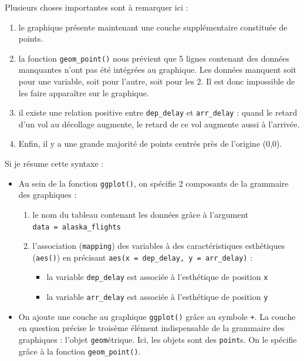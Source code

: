 \documentclass[a4paperpaper,]{article}
\providecommand{\tightlist}{%
  \setlength{\itemsep}{0pt}\setlength{\parskip}{0pt}}
\theoremstyle{definition}
\theoremstyle{definition}
\theoremstyle{definition}
\theoremstyle{remark}
\begin{document}
Plusieurs choses importantes sont à remarquer ici :

\begin{enumerate}
\def\labelenumi{\arabic{enumi}.}
\tightlist
\item
  le graphique présente maintenant une couche supplémentaire constituée
  de points.
\item
  la fonction \texttt{geom\_point()} nous prévient que 5 lignes
  contenant des données manquantes n'ont pas été intégrées au graphique.
  Les données manquent soit pour une variable, soit pour l'autre, soit
  pour les 2. Il est donc impossible de les faire apparaître sur le
  graphique.
\item
  il existe une relation positive entre \texttt{dep\_delay} et
  \texttt{arr\_delay} : quand le retard d'un vol au décollage augmente,
  le retard de ce vol augmente aussi à l'arrivée.
\item
  Enfin, il y a une grande majorité de points centrés près de l'origine
  (0,0).
\end{enumerate}

Si je résume cette syntaxe :

\begin{itemize}
\tightlist
\item
  Au sein de la fonction \texttt{ggplot()}, on spécifie 2 composants de
  la grammaire des graphiques :

  \begin{enumerate}
  \def\labelenumi{\arabic{enumi}.}
  \tightlist
  \item
    le nom du tableau contenant les données grâce à l'argument
    \texttt{data\ =\ alaska\_flights}
  \item
    l'association (\texttt{mapping}) des variables à des
    caractéristiques esthétiques (\texttt{aes()}) en précisant
    \texttt{aes(x\ =\ dep\_delay,\ y\ =\ arr\_delay)} :

    \begin{itemize}
    \tightlist
    \item
      la variable \texttt{dep\_delay} est associée à l'esthétique de
      position \texttt{x}
    \item
      la variable \texttt{arr\_delay} est associée à l'esthétique de
      position \texttt{y}
    \end{itemize}
  \end{enumerate}
\item
  On ajoute une couche au graphique \texttt{ggplot()} grâce au symbole
  \texttt{+}. La couche en question précise le troisème élément
  indispensable de la grammaire des graphiques : l'objet
  \texttt{geom}étrique. Ici, les objets sont des \texttt{point}s. On le
  spécifie grâce à la fonction \texttt{geom\_point()}.
\end{itemize}
\end{document}
